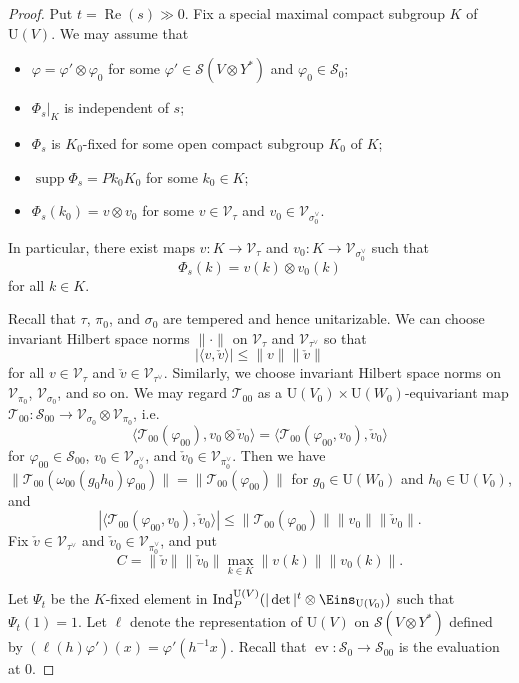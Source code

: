 \documentclass[11pt]{amsart}
\numberwithin{equation}{section}
\theoremstyle{plain}
\theoremstyle{definition}
\theoremstyle{remark}
\def\ev{\operatorname{ev}}
\def\Ind{\operatorname{Ind}}
\def\Re{\operatorname{Re}}
\def\supp{\operatorname{supp}}
\def\U{\mathrm{U}}
\def\T{\mathcal{T}}
\def\s{\mathscr{S}}
\def\V{\mathscr{V}}
\def\1{\Eins}
\begin{document}
\begin{proof}
Put $t = \Re(s) \gg 0$.
Fix a special maximal compact subgroup $K$ of $\U(V)$.
We may assume that
\begin{itemize}
\item $\varphi = \varphi' \otimes \varphi_0$ for some $\varphi' \in \s(V \otimes Y^*)$ and $\varphi_0 \in \s_0$;
\item $\Phi_s|_K$ is independent of $s$;
\item $\Phi_s$ is $K_0$-fixed for some open compact subgroup $K_0$ of $K$;
\item $\supp \Phi_s = P k_0 K_0$ for some $k_0 \in K$;
\item $\Phi_s(k_0) = v \otimes v_0$ for some $v \in \V_{\tau}$ and $v_0 \in \V_{\sigma_0^\vee}$.
\end{itemize}
In particular, there exist maps $v:K \rightarrow \V_{\tau}$ and $v_0 : K \rightarrow \V_{\sigma_0^\vee}$ such that
\[
 \Phi_s(k) = v(k) \otimes v_0(k)
\]
for all $k \in K$.

Recall that $\tau$, $\pi_0$, and $\sigma_0$ are tempered and hence unitarizable.
We can choose invariant Hilbert space norms $\| \cdot \|$ on $\V_{\tau}$ and $\V_{\tau^\vee}$ so that
\[
 | \langle v, \check{v} \rangle | \le \| v \| \| \check{v} \|
\]
for all $v \in \V_{\tau}$ and $\check{v} \in \V_{\tau^\vee}$.
Similarly, we choose invariant Hilbert space norms on $\V_{\pi_0}$, $\V_{\sigma_0}$, and so on.
We may regard $\T_{00}$ as a $\U(V_0) \times \U(W_0)$-equivariant map $\T_{00}: \s_{00}  \rightarrow \V_{\sigma_0} \otimes \V_{\pi_0}$, i.e. 
\[
 \langle \T_{00}(\varphi_{00}), v_0 \otimes \check{v}_0 \rangle 
 = \langle \T_{00}(\varphi_{00}, v_0), \check{v}_0 \rangle
\]
for $\varphi_{00} \in \s_{00}$, $v_0 \in \V_{\sigma_0^\vee}$, and $\check{v}_0 \in \V_{\pi_0^\vee}$.
Then we have $\| \T_{00}(\omega_{00}(g_0h_0)\varphi_{00}) \| = \| \T_{00}(\varphi_{00}) \|$ for $g_0 \in \U(W_0)$ and $h_0 \in \U(V_0)$, and 
\[
 | \langle \T_{00}(\varphi_{00}, v_0), \check{v}_0 \rangle | \le
 \| \T_{00}(\varphi_{00}) \| \| v_0 \| \| \check{v}_0 \|.
\]
Fix $\check{v} \in \V_{\tau^\vee}$ and $\check{v}_0 \in \V_{\pi_0^\vee}$, and put
\[
 C = \| \check{v} \| \| \check{v}_0 \| \max_{k \in K} \| v(k) \| \| v_0(k) \|.
\]

Let $\Psi_t$ be the $K$-fixed element in $\Ind^{\U(V)}_P(|\det|^t \otimes \1_{\U(V_0)})$ such that $\Psi_t(1) = 1$.
Let $\ell$ denote the representation of $\U(V)$ on $\s(V \otimes Y^*)$ defined by $(\ell(h) \varphi')(x) = \varphi'(h^{-1} x)$.
Recall that $\ev : \s_0 \rightarrow \s_{00}$ is the evaluation at $0$.


\end{proof}
\end{document}
